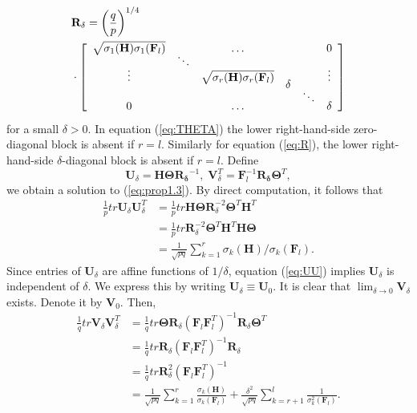 \documentclass[12pt,onecolumn,draftcls]{IEEEtran}
\begin{document}
\begin{align}
&\mathbf{R_{\delta}} =
\left( \frac{q}{p} \right)^{1/4}\nonumber\\
 & \cdot \left[
\begin{array}{cccccc}
\sqrt{\sigma_1(\mathbf{H})\sigma_1(\mathbf{F}_l)} && \ldots   &  && 0  \vspace{-0.2cm}\\
&\ddots&&&& \vspace{-0.2cm}\\
\vdots&&\sqrt{\sigma_r(\mathbf{H})\sigma_r(\mathbf{F}_l)}&&&\vdots \vspace{-0.2cm}\\
&&& \delta&& \vspace{-0.2cm}\\
&&&& \ddots  &    \vspace{-0.2cm}\\
0 & &  \ldots && &  \delta
\end{array}
\right]
\label{eq:R}
\end{align}
for a small $\delta>0$.  In equation (\ref{eq:THETA}) the lower right-hand-side zero-diagonal block is absent if $r=l$.
Similarly for equation (\ref{eq:R}), the lower right-hand-side $\delta$-diagonal block is absent if $r=l$.   Define
\begin{equation}
\mathbf{U}_\delta=\mathbf{H} \mathbf{\Theta} \mathbf{R_{\delta}}^{-1}, \;
\mathbf{V}_\delta^T=\mathbf{F}_l^{-1} \mathbf{R_{\delta}} \mathbf{\Theta}^T,
\end{equation}
we obtain a solution to (\ref{eq:prop1.3}).  
By direct computation, it follows that
\begin{align}
\frac{1}{p} tr \mathbf{U}_\delta \mathbf{U}_\delta^T &= \frac{1}{p}  tr \mathbf{H}\mathbf{\Theta}
\mathbf{R}_\delta^{-2} \mathbf{\Theta}^T \mathbf{H}^T \\
&=  \frac{1}{p} tr \mathbf{R}_\delta^{-2} \mathbf{\Theta}^T \mathbf{H}^T \mathbf{H} \mathbf{\Theta}\\
&=  \frac{1}{\sqrt{pq}} \sum_{k=1}^{r} \sigma_{k}(\mathbf{H})/\sigma_{k}(\mathbf{F}_l).
\label{eq:UU}
\end{align}
Since entries of $\mathbf{U}_\delta$ are affine functions of $1/\delta$, equation (\ref{eq:UU})
implies $\mathbf{U}_\delta$
is independent of $\delta$.   We express this by writing $\mathbf{U}_\delta\equiv\mathbf{U}_0$.  It is clear that
$\lim_{\delta \rightarrow 0} \mathbf{V}_\delta$
exists.  Denote it by $\mathbf{V}_0$.
Then,
\begin{align}
\frac{1}{q} tr \mathbf{V}_\delta \mathbf{V}_\delta^T & =  \frac{1}{q} tr \mathbf{\Theta} \mathbf{R}_\delta
(\mathbf{F}_l\mathbf{F}_l^T)^{-1} \mathbf{R}_\delta \mathbf{\Theta}^T\\
&= \frac{1}{q} tr \mathbf{R}_\delta(\mathbf{F}_l\mathbf{F}_l^T)^{-1} \mathbf{R}_\delta \\
&= \frac{1}{q} tr \mathbf{R}_\delta^2 (\mathbf{F}_l\mathbf{F}_l^T)^{-1}\\
& = \frac{1}{\sqrt{pq}} \sum_{k=1}^{r} \frac{\sigma_{k}(\mathbf{H})}{\sigma_{k}(\mathbf{F}_l)} + \frac{\delta^2}{\sqrt{pq}} \sum_{k=r+1}^{l} \frac{1}{\sigma_{k}^2(\mathbf{F}_l)}.
\label{eq:VV}
\end{align}
\end{document}
